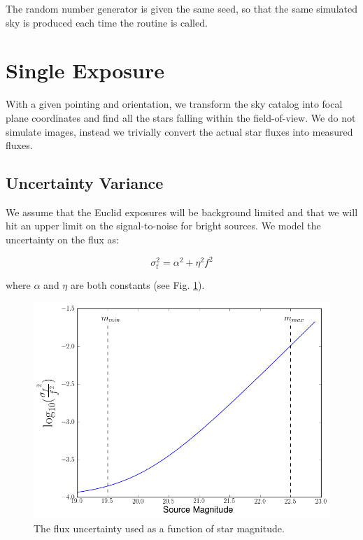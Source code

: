 \documentclass[12pt,a4paper,twoside]{article}
\begin{document}
The random number generator is given the same seed, so that the same simulated sky is produced each time the routine is called.

\section{Single Exposure}
With a given pointing and orientation, we transform the sky catalog into focal plane coordinates and find all the stars falling within the field-of-view. We do not simulate images, instead we trivially convert the actual star fluxes into measured fluxes. 

\subsection{Uncertainty Variance}
We assume that the Euclid exposures will be background limited and that we will hit an upper limit on the signal-to-noise for bright sources. We model the uncertainty on the flux as:

\begin{equation}
\sigma_{\text{f}}^{2} = \alpha^{2} + \eta^{2} f^{2} 
\end{equation}

\noindent{}where $\alpha$ and $\eta$ are both constants (see Fig. \ref{fig:flux_uncertainty}).

\begin{figure}[ht]
\begin{center}
\includegraphics[width=\textwidth]{flux_uncertainty_variance.png}
\end{center}
\caption{The flux uncertainty used as a function of star magnitude.\label{fig:flux_uncertainty}}
\end{figure}
\end{document}
